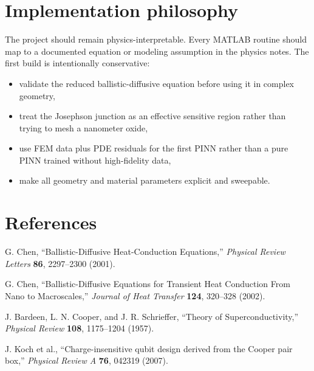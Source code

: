 \documentclass[11pt]{article}
\begin{document}
\section{Implementation philosophy}
The project should remain physics-interpretable. Every MATLAB routine should map to a documented equation or modeling assumption in the physics notes. The first build is intentionally conservative:
\begin{itemize}[leftmargin=1.6em]
    \item validate the reduced ballistic-diffusive equation before using it in complex geometry,
    \item treat the Josephson junction as an effective sensitive region rather than trying to mesh a nanometer oxide,
    \item use FEM data plus PDE residuals for the first PINN rather than a pure PINN trained without high-fidelity data,
    \item make all geometry and material parameters explicit and sweepable.
\end{itemize}

\section{References}
\begin{enumerate}[label={[\arabic*]}]
    \item G. Chen, ``Ballistic-Diffusive Heat-Conduction Equations,'' \emph{Physical Review Letters} \textbf{86}, 2297--2300 (2001).
    \item G. Chen, ``Ballistic-Diffusive Equations for Transient Heat Conduction From Nano to Macroscales,'' \emph{Journal of Heat Transfer} \textbf{124}, 320--328 (2002).
    \item J. Bardeen, L. N. Cooper, and J. R. Schrieffer, ``Theory of Superconductivity,'' \emph{Physical Review} \textbf{108}, 1175--1204 (1957).
    \item J. Koch et al., ``Charge-insensitive qubit design derived from the Cooper pair box,'' \emph{Physical Review A} \textbf{76}, 042319 (2007).
\end{enumerate}
\end{document}
